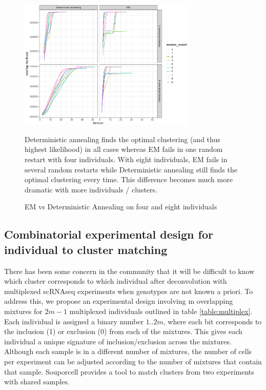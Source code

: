 \begin{figure}[th!]
\caption{EM vs Deterministic Annealing on four and eight individuals}
\label{figure:annealing}
\begin{centering}

\includegraphics[width=0.75\textwidth]{annealing.png} 
\par{Deterministic annealing finds the optimal clustering (and thus highest likelihood) in all cases whereas EM fails in one random restart with four individuals. With eight individuals, EM fails in several random restarts while Deterministic annealing still finds the optimal clustering every time. This difference becomes much more dramatic with more individuals / clusters.}

\end{centering}
\end{figure}


\subsection{Combinatorial experimental design for individual to cluster matching}
\par{
There has been some concern in the community that it will be difficult to know which cluster corresponds to which individual after deconvolution with multiplexed scRNAseq experiments when genotypes are not known a priori. To address this, we propose an experimental design involving m overlapping mixtures for $2m-1$ multiplexed individuals outlined in table \ref{table:multiplex}. Each individual is assigned a binary number $1..2m$, where each bit corresponds to the inclusion (1) or exclusion (0) from each of the mixtures. This gives each individual a unique signature of inclusion/exclusion across the mixtures. Although each sample is in a different number of mixtures, the number of cells per experiment can be adjusted according to the number of mixtures that contain that sample. Souporcell provides a tool to match clusters from two experiments with shared samples.
}




